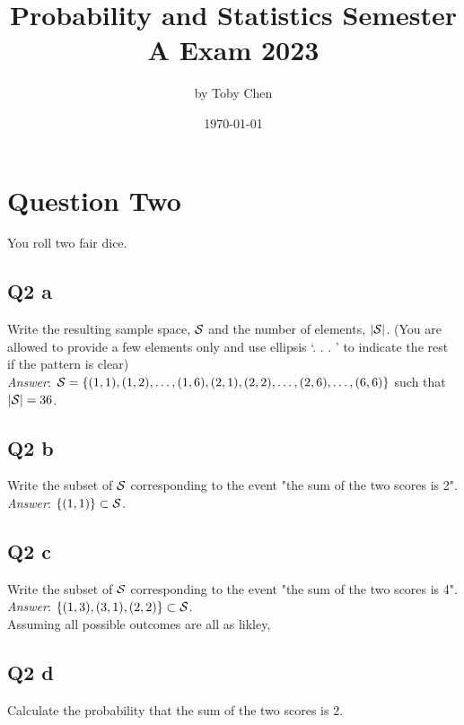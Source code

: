 \documentclass{article}
\title{Probability and Statistics Semester A Exam 2023}
\author{by Toby Chen}
\date{\today}
\begin{document}
    \maketitle

    \tableofcontents

    \section{Question Two}
        You roll two fair dice.

        \subsection{Q2 a}
            Write the resulting sample space, $\mathcal{S}$ and the number of elements, $|\mathcal{S}|$. (You are allowed to provide a few elements only and use ellipsis ‘. . . ’ to indicate the rest if the pattern is clear)\\
            
            \textit{Answer}: $\mathcal{S} = \left\{ (1,1), (1,2), \dots, (1,6), (2,1), (2,2), \dots, (2,6), \dots, (6,6) \right\}$ such that $|\mathcal{S}| = 36$.

        \subsection{Q2 b}
            Write the subset of $\mathcal{S}$ corresponding to the event "the sum of the two scores is 2".\\

            \textit{Answer}: $\left\{ (1,1) \right\} \subset \mathcal{S}$.

        \subsection{Q2 c}
            Write the subset of $\mathcal{S}$ corresponding to the event "the sum of the two scores is 4".\\

            \textit{Answer}: $\left\{ (1,3), (3,1), (2,2) \right\} \subset \mathcal{S}$.\\

            Assuming all possible outcomes are all as likley,

        \subsection{Q2 d}
            Calculate the probability that the sum of the two scores is 2.\\
\end{document}
